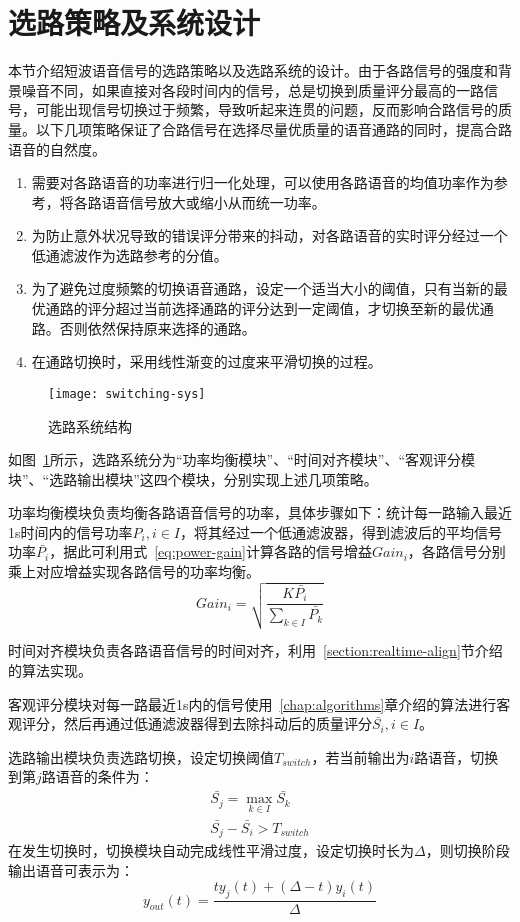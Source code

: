 \section{选路策略及系统设计}

本节介绍短波语音信号的选路策略以及选路系统的设计。由于各路信号的强度和背景噪音不同，如果直接对各段时间内的信号，总是切换到质量评分最高的一路信号，可能出现信号切换过于频繁，导致听起来连贯的问题，反而影响合路信号的质量。以下几项策略保证了合路信号在选择尽量优质量的语音通路的同时，提高合路语音的自然度。
\begin{enumerate}
    \item 需要对各路语音的功率进行归一化处理，可以使用各路语音的均值功率作为参考，将各路语音信号放大或缩小从而统一功率。
    \item 为防止意外状况导致的错误评分带来的抖动，对各路语音的实时评分经过一个低通滤波作为选路参考的分值。
    \item 为了避免过度频繁的切换语音通路，设定一个适当大小的阈值，只有当新的最优通路的评分超过当前选择通路的评分达到一定阈值，才切换至新的最优通路。否则依然保持原来选择的通路。 
    \item 在通路切换时，采用线性渐变的过度来平滑切换的过程。
\end{enumerate}

\begin{figure}
\centering
\texttt{[image: switching-sys]}
\caption{选路系统结构\label{fig:switching-sys}}
\end{figure}

如图~\ref{fig:switching-sys}所示，选路系统分为“功率均衡模块”、“时间对齐模块”、“客观评分模块”、“选路输出模块”这四个模块，分别实现上述几项策略。

功率均衡模块负责均衡各路语音信号的功率，具体步骤如下：统计每一路输入最近1s时间内的信号功率$P_i, i \in I$，将其经过一个低通滤波器，得到滤波后的平均信号功率$\bar{P_i}$，据此可利用式~\ref{eq:power-gain}计算各路的信号增益$Gain_i$，各路信号分别乘上对应增益实现各路信号的功率均衡。
\begin{equation}\label{eq:power-gain}
Gain_i = \sqrt{\frac {K\bar{P_i}} {\sum_{k \in I}{\bar{P_k}}} }
\end{equation}

时间对齐模块负责各路语音信号的时间对齐，利用~\ref{section:realtime-align}节介绍的算法实现。

客观评分模块对每一路最近1s内的信号使用~\ref{chap:algorithms}章介绍的算法进行客观评分，然后再通过低通滤波器得到去除抖动后的质量评分$\bar{S_i}, i \in I$。

选路输出模块负责选路切换，设定切换阈值$T_{switch}$，若当前输出为$i$路语音，切换到第$j$路语音的条件为：
\begin{equation}
\begin{array}{l}
\bar{S_j} = \max_{k \in I} \bar{S_k} \\
\bar{S_j} - \bar{S_i} > T_{switch}
\end{array}
\end{equation}
在发生切换时，切换模块自动完成线性平滑过度，设定切换时长为$\Delta$，则切换阶段输出语音可表示为：
\begin{equation}
y_{out}(t) = \frac{ty_j(t)+(\Delta-t)y_i(t)}{\Delta}
\end{equation}

